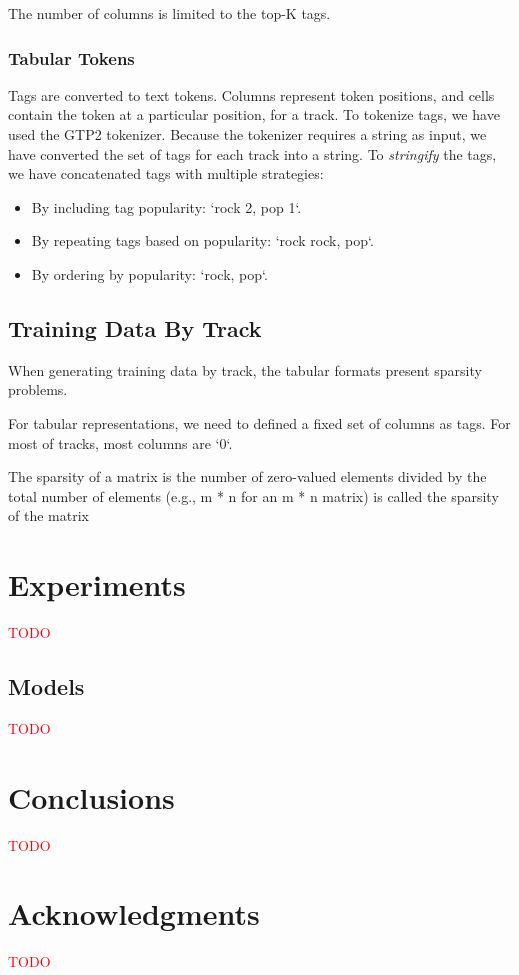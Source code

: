 \documentclass[fleqn,10pt]{olplainarticle}
\begin{document}
The number of columns is limited to the top-K tags.

\subsubsection*{Tabular Tokens}

Tags are converted to text tokens. Columns represent token positions, and cells contain the token at a particular position, for a track.
To tokenize tags, we have used the GTP2 tokenizer.
Because the tokenizer requires a string as input, we have converted the set of tags for each track into a string.
To \emph{stringify} the tags, we have concatenated tags with multiple strategies:

\begin{itemize}
      \item By including tag popularity: `rock 2, pop 1`.
      \item By repeating tags based on popularity: `rock rock, pop`.
      \item By ordering by popularity: `rock, pop`.
\end{itemize}

\subsection*{Training Data By Track}

When generating training data by track, the tabular formats present sparsity problems.

For tabular representations, we need to defined a fixed set of columns as tags.
For most of tracks, most columns are `0`.

The sparsity of a matrix is the number of zero-valued elements divided by the total number of elements
(e.g., m * n for an m * n matrix) is called the sparsity of the matrix


\section*{Experiments}

\textcolor{red}{TODO}

\subsection*{Models}

\textcolor{red}{TODO}



\section*{Conclusions}

\textcolor{red}{TODO}



\section*{Acknowledgments}

\textcolor{red}{TODO}


\end{document}

